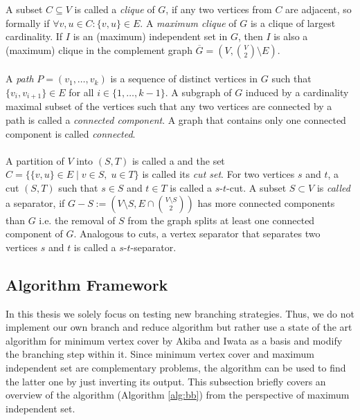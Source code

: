 \documentclass[12pt,a4paper,twoside]{scrartcl}
\numberwithin{equation}{section}
\begin{document}
A subset $C\subseteq V$ is called a \emph{clique} of $G$, if any two vertices from $C$ are adjacent, so formally if $\forall v,u\in C:\{v,u\}\in E$. A \emph{maximum clique} of $G$ is a clique of largest cardinality. If $I$ is an (maximum) independent set in $G$, then $I$ is also a (maximum) clique in the complement graph $\overline{G}=(V, \binom{V}{2}\setminus E)$.\paragraph{}
A \textit{path} $P=(v_1,\dots,v_k)$ is a sequence of distinct vertices in $G$ such that $\{v_i,v_{i+1}\}\in E$ for all $i \in \{1,\dots,k-1\}$. A subgraph of $G$ induced by a cardinality maximal subset of the vertices such that any two vertices are connected by a path is called a \textit{connected component}. A graph that contains only one connected component is called \textit{connected}. \paragraph{}
A partition of $V$ into $(S,T)$ is called a  and the set $C = \{\{v,u\}\in E\;|\;v\in S,\; u\in T\}$ is called its \textit{cut set}. For two vertices $s$ and $t$, a cut $(S, T)$ such that $s\in S$ and $t\in T$ is called a $s$-$t$-cut. A subset $S\subset V$ is \textit{called} a separator, if $G-S := (V\setminus S, E\cap\binom{V\setminus S}{2})$ has more connected components than $G$ i.e. the removal of $S$ from the graph splits at least one connected component of $G$. Analogous to cuts, a vertex separator that separates two vertices $s$ and $t$ is called a $s$-$t$-separator.

\subsection{Algorithm Framework}

In this thesis we solely focus on testing new branching strategies. Thus, we do not implement our own branch and reduce algorithm but rather use a state of the art algorithm for minimum vertex cover by Akiba and Iwata \cite{AkibaIwata} as a basis and modify the branching step within it. Since minimum vertex cover and maximum independent set are complementary problems, the algorithm can be used to find the latter one by just inverting its output. This subsection briefly covers an overview of the algorithm (Algorithm \ref{alg:bb}) from the perspective of maximum independent set.
\end{document}
